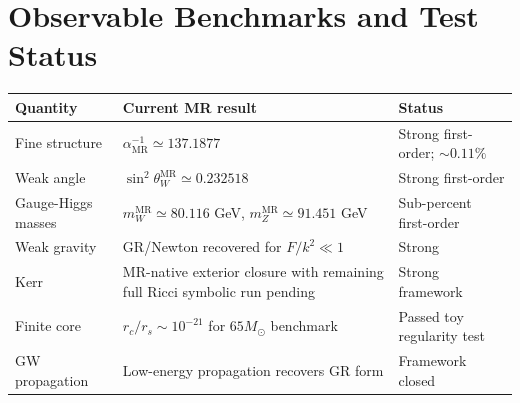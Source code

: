 \documentclass[11pt]{article}
\newcommand{\MR}{\mathrm{MR}}
\begin{document}
\section{Observable Benchmarks and Test Status}
\begin{longtable}{>{\raggedright\arraybackslash}p{} >{\raggedright\arraybackslash}p{} >{\raggedright\arraybackslash}p{}}
\toprule
\textbf{Quantity} & \textbf{Current MR result} & \textbf{Status} \\
\midrule
\endhead
Fine structure & $\alpha^{-1}_{\MR}\simeq137.1877$ & Strong first-order; $\sim0.11\%$ \\
Weak angle & $\sin^2\theta_W^{\MR}\simeq0.232518$ & Strong first-order \\
Gauge-Higgs masses & $m_W^{\MR}\simeq80.116$ GeV, $m_Z^{\MR}\simeq91.451$ GeV & Sub-percent first-order \\
Weak gravity & GR/Newton recovered for $F/k^2\ll1$ & Strong \\
Kerr & MR-native exterior closure with remaining full Ricci symbolic run pending & Strong framework \\
Finite core & $r_c/r_s\sim10^{-21}$ for $65M_\odot$ benchmark & Passed toy regularity test \\
GW propagation & Low-energy propagation recovers GR form & Framework closed \\
\bottomrule
\end{longtable}
\end{document}
